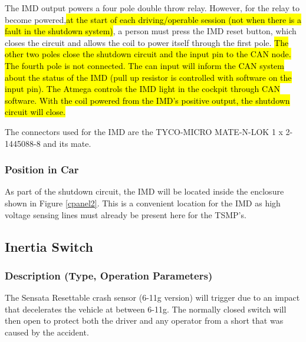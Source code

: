 \documentclass{article}
\DeclareRobustCommand{\hlr}[1]{{\sethlcolor{red}\hl{#1}}}
\begin{document}
            The IMD output powers a four pole double throw relay. However, for the relay to become powered,\hlr{at the start of each driving/operable session (not when there is a fault in the shutdown system)}, a person must press the IMD reset button, which closes the circuit and allows the coil to power itself through the first pole. \hlr{The other two poles close the shutdown circuit and the input pin to the CAN node. The fourth pole is not connected. The can input will inform the CAN system about the status of the IMD (pull up resistor is controlled with software on the input pin). The Atmega controls the IMD light in the cockpit through CAN software. With the coil powered from the IMD's positive output, the shutdown circuit will close. }

            The connectors used for the IMD are the TYCO-MICRO MATE-N-LOK 1 x 2-1445088-8 and its mate. 
            

        \subsubsection{Position in Car}

            As part of the shutdown circuit, the IMD will be located inside the enclosure shown in Figure \ref{cpanel2}. This is a convenient location for the IMD as high voltage sensing lines must already be present here for the TSMP's.

    \subsection{Inertia Switch}

        \subsubsection{Description (Type, Operation Parameters)}

            The Sensata Resettable crash sensor (6-11g version) will trigger due to an impact that decelerates the vehicle at between 6-11g. The normally closed switch will then open to protect both the driver and any operator from a short that was caused by the accident.
            
\end{document}
